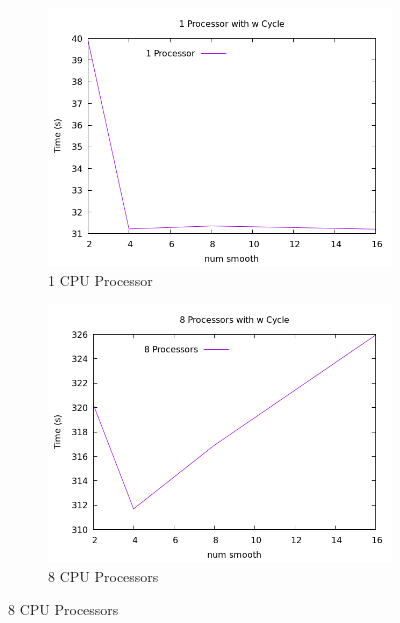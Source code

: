 \documentclass{article}
\begin{document}
\begin{figure}[H]
    \centering
    \begin{subfigure}{0.48\textwidth}
        \includegraphics[width=\textwidth]{1 Proc with w Cycle.png}
        \caption{1 CPU Processor}
        \label{fig:1 Proc with w Cycle}
    \end{subfigure}
    \hfill
    \begin{subfigure}{0.48\textwidth}
        \includegraphics[width=\textwidth]{8 Proc with w Cycle.png}
        \caption{8 CPU Processors}
        \label{fig:8 Procs with w Cycle}
    \end{subfigure}
    

\end{figure}
\end{document}
